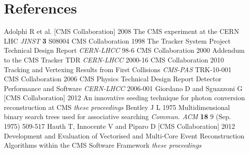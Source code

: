 \newpage
\section*{References}

\begin{thebibliography}{99}
  Adolphi R et al. [CMS Collaboration] 2008 The CMS experiment at the CERN LHC
  {\em JINST} {\bf 3} S08004 
 CMS Collaboration 1998 The Tracker System Project Technical Design Report
  {\em CERN-LHCC} 98-6
 CMS Collaboration 2000 Addendum to the CMS Tracker TDR {\em
   CERN-LHCC} 2000-16
 CMS Collaboration 2010 Tracking and Vertexing Results from First Collisions
{\em CMS-PAS} TRK-10-001
 CMS Collaboration 2006 CMS Physics Technical Design
    Report Detector Performance and Software {\em
      CERN-LHCC} 2006-001
 Giordano D and Sguazzoni G [CMS
  Collaboration] 2012 An innovative seeding technique for photon conversion
  reconstruction at CMS {\em these proceedings}
 Bentley J L 1975 Multidimensional binary search
    trees used for associative searching {\em Commun. ACM} {\bf 18} 9 (Sep. 1975) 509-517 
 Hauth T, Innocente V and Piparo D [CMS
  Collaboration] 2012 Development and Evaluation of Vectorised and
    Multi-Core Event Reconstruction Algorithms within the CMS Software
    Framework {\em these proceedings}
\end{thebibliography}
